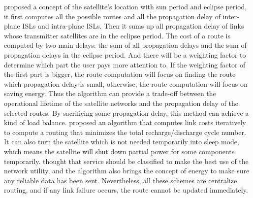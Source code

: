 \cite{LOCATIONAWARE} proposed a concept of the satellite's location with sun period and eclipse period, it first computes all the possible routes and all the propagation delay of inter-plane ISLs and intra-plane ISLs. Then it sums up all propagation delay of links whose transmitter satellites are in the eclipse period. The cost of a route is computed by two main delays: the sum of all propagation delays and the sum of propagation delays in the eclipse period. And there will be a weighting factor to determine which part the user pays more attention to. If the weighting factor of the first part is bigger, the route computation will focus on finding the route which propagation delay is small, otherwise, the route computation will focus on saving energy. Thus the algorithm can provide a trade-off between the operational lifetime of the satellite networks and the propagation delay of the selected routes. By sacrificing some propagation delay, this method can achieve a kind of load balance. 
\cite{TOWARDS} proposed an algorithm that computes link costs iteratively to compute a routing that minimizes the total recharge/discharge cycle number. It can also turn the satellite which is not needed temporarily into sleep mode, which means the satellite will shut down partial power for some components temporarily. \cite{QOS} thought that service should be classified to make the best use of the network utility, and the algorithm also brings the concept of energy to make sure any reliable data has been sent. Nevertheless, all these schemes are centralize routing, and if any link failure occurs, the route cannot be updated immediately.